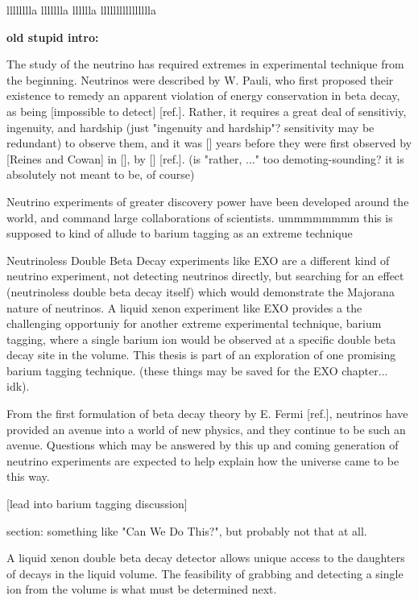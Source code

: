 lllllllla llllllla lllllla lllllllllllllllla

\noindent
{\color{gray}\textbf{old stupid intro:}

The study of the neutrino has required extremes in experimental technique from the beginning.  Neutrinos were described by W. Pauli, who first proposed their existence to remedy an apparent violation of energy conservation in beta decay, as being [impossible to detect] [ref.].  Rather, it requires a great deal of sensitiviy, ingenuity, and hardship (just "ingenuity and hardship"?  sensitivity may be redundant) to observe them, and it was [] years before they were first observed by [Reines and Cowan] in [], by [] [ref.].  (is "rather, ..." too demoting-sounding?  it is absolutely not meant to be, of course)

Neutrino experiments of greater discovery power have been developed around the world, and command large collaborations of scientists.  ummmmmmmm  this is supposed to kind of allude to barium tagging as an extreme technique

Neutrinoless Double Beta Decay experiments like EXO are a different kind of neutrino experiment, not detecting neutrinos directly, but searching for an effect (neutrinoless double beta decay itself) which would demonstrate the Majorana nature of neutrinos.  A liquid xenon experiment like EXO provides a the challenging opportuniy for another extreme experimental technique, barium tagging, where a single barium ion would be observed at a specific double beta decay site in the volume.  This thesis is part of an exploration of one promising barium tagging technique.  (these things may be saved for the EXO chapter... idk).

From the first formulation of beta decay theory by E. Fermi [ref.], neutrinos have provided an avenue into a world of new physics, and they continue to be such an avenue.  Questions which may be answered by this up and coming generation of neutrino experiments are expected to help explain how the universe came to be this way.

[lead into barium tagging discussion]

section: something like "Can We Do This?", but probably not that at all.

A liquid xenon double beta decay detector allows unique access to the daughters of decays in the liquid volume.  The feasibility of grabbing and detecting a single ion from the volume is what must be determined next.}